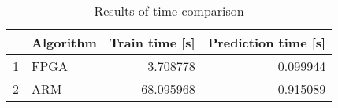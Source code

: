 \begin{table}
\footnotesize
\caption{Results of time comparison}
\label{tab:time comparison}
\begin{tabular}{llrr}
\hline
 & Algorithm & Train time [s] & Prediction time [s] \\
\hline
1 & FPGA & 3.708778 & 0.099944 \\
2 & ARM & 68.095968 & 0.915089 \\
\hline
\end{tabular}
\end{table}
